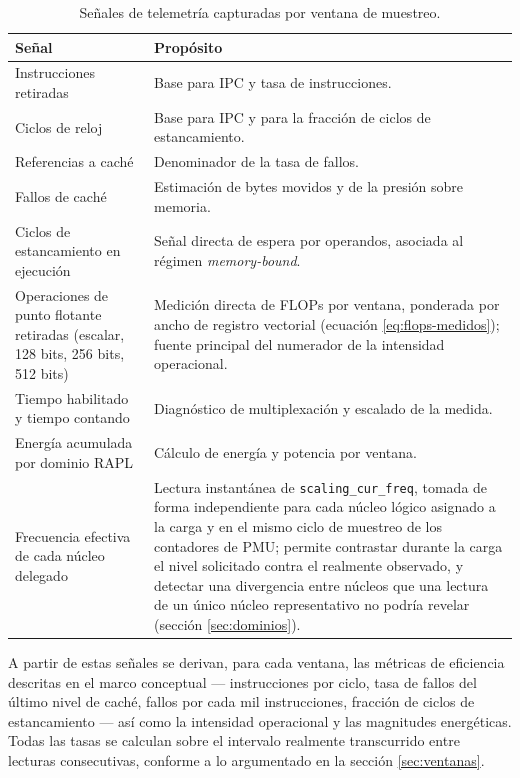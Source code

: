 \documentclass[12pt,oneside,spanish]{book}
\begin{document}
\begin{table}[H]
\centering
\caption{Señales de telemetría capturadas por ventana de muestreo.}
\label{tab:contadores}
\begin{tabular}{@{}p{5.2cm}p{9.3cm}@{}}
\toprule
\textbf{Señal} & \textbf{Propósito} \\
\midrule
Instrucciones retiradas & Base para IPC y tasa de instrucciones. \\
Ciclos de reloj & Base para IPC y para la fracción de ciclos de estancamiento. \\
Referencias a caché & Denominador de la tasa de fallos. \\
Fallos de caché & Estimación de bytes movidos y de la presión sobre memoria. \\
Ciclos de estancamiento en ejecución & Señal directa de espera por operandos, asociada al régimen \textit{memory-bound}. \\
Operaciones de punto flotante retiradas (escalar, 128 bits, 256 bits, 512 bits) & Medición directa de FLOPs por ventana, ponderada por ancho de registro vectorial (ecuación \eqref{eq:flops-medidos}); fuente principal del numerador de la intensidad operacional. \\
Tiempo habilitado y tiempo contando & Diagnóstico de multiplexación y escalado de la medida. \\
Energía acumulada por dominio RAPL & Cálculo de energía y potencia por ventana. \\
Frecuencia efectiva de cada núcleo delegado & Lectura instantánea de \texttt{scaling\_cur\_freq}, tomada de forma independiente para cada núcleo lógico asignado a la carga y en el mismo ciclo de muestreo de los contadores de PMU; permite contrastar durante la carga el nivel solicitado contra el realmente observado, y detectar una divergencia entre núcleos que una lectura de un único núcleo representativo no podría revelar (sección \ref{sec:dominios}). \\
\bottomrule
\end{tabular}
\end{table}

A partir de estas señales se derivan, para cada ventana, las métricas de eficiencia descritas en el marco conceptual --- instrucciones por ciclo, tasa de fallos del último nivel de caché, fallos por cada mil instrucciones, fracción de ciclos de estancamiento --- así como la intensidad operacional y las magnitudes energéticas. Todas las tasas se calculan sobre el intervalo realmente transcurrido entre lecturas consecutivas, conforme a lo argumentado en la sección \ref{sec:ventanas}.
\end{document}
